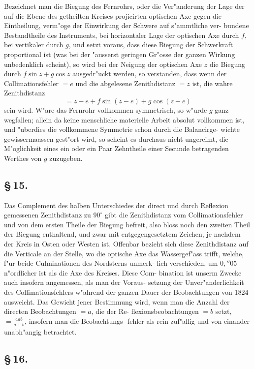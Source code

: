 \documentclass[12pt,a4paper]{article}
\theoremstyle{plain}
\theoremstyle{definition}
\theoremstyle{remark}
\begin{document}
Bezeichnet man die Biegung des Fernrohrs, oder die Ver"anderung der
Lage der auf die Ebene des getheilten Kreises projicirten optischen Axe gegen
die Eintheilung, verm"oge der Einwirkung der Schwere auf s"ammtliche ver-
bundene Bestandtheile des Instruments, bei horizontaler Lage der optischen
Axe durch $f$, bei vertikaler durch $g$, und setzt voraus, dass diese Biegung der
Schwerkraft proportional ist (was bei der "ausserst geringen Gr"osse der ganzen
Wirkung unbedenklich scheint), so wird bei der Neigung der optischen Axe $z$
die Biegung durch $f\sin z + g\cos z$ ausgedr"uckt werden, so verstanden, dass wenn
der Collimationsfehler $=e$ und die abgelesene Zenithdistanz $=z$ ist, die wahre
Zenithdistanz
\[
= z - e + f\sin(z-e) + g\cos(z-e)
\]
sein wird. W"are das Fernrohr vollkommen symmetrisch, so w"urde $g$ ganz
wegfallen; allein da keine menschliche materielle Arbeit absolut vollkommen
ist, und "uberdies die vollkommene Symmetrie schon durch die Balancirge-
wichte gewissermaassen gest"ort wird, so scheint es durchaus nicht ungereimt,
die M"oglichkeit eines ein oder ein Paar Zehntheile einer Secunde betragenden
Werthes von $g$ zuzugeben.

\subsection*{\S\,15.}

Das Complement des halben Unterschiedes der direct und durch Reflexion
gemessenen Zenithdistanz zu $90^{\circ}$ gibt die Zenithdistanz vom Collimationsfehler
und von dem ersten Theile der Biegung befreit, also bloss noch den zweiten
Theil der Biegung enthaltend, und zwar mit entgegengesetztem Zeichen, je
nachdem der Kreis in Osten oder Westen ist. Offenbar bezieht sich diese
Zenithdistanz auf die Verticale an der Stelle, wo die optische Axe das
Wassergef"ass trifft, welche, f"ur beide Culminationen des Nordsterns unmerk-
lich verschieden, um $0{,}''05$ n"ordlicher ist als die Axe des Kreises. Diese Com-
bination ist unserm Zwecke auch insofern angemessen, als man der Voraus-
setzung der Unver"anderlichkeit des Collimationsfehlers w"ahrend der ganzen
Dauer der Beobachtungen von 1824 ausweicht. Das Gewicht jener Bestimmung
wird, wenn man die Anzahl der directen Beobachtungen $=a$, die der Re-
flexionsbeobachtungen $=b$ setzt, $=\frac{4ab}{a+b}$, insofern man die Beobachtungs-
fehler als rein zuf"allig und von einander unabh"angig betrachtet.

\subsection*{\S\,16.}
\end{document}
